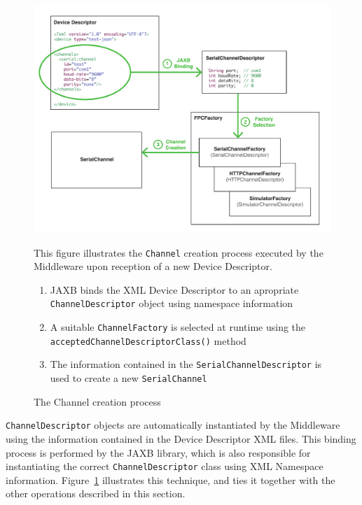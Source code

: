 \begin{figure}[!hbt]
\includegraphics[width=\textwidth]{imgs/channel_creation_process.pdf}
\caption{The Channel creation process}
\label{fig:channel.creation}
{
\begin{figurenote}
This figure illustrates the \texttt{Channel} creation process executed by the Middleware upon reception of a new Device Descriptor.
\begin{enumerate}
  \itemsep0em
  \item JAXB binds the XML Device Descriptor to an apropriate \texttt{ChannelDescriptor} object using namespace information
  \item A suitable \texttt{ChannelFactory} is selected at runtime using the \texttt{acceptedChannelDescriptorClass()} method
  \item The information contained in the \texttt{SerialChannelDescriptor} is used to create a new \texttt{SerialChannel}
\end{enumerate}
\end{figurenote}
}
\end{figure}

\texttt{ChannelDescriptor} objects are automatically instantiated by the Middleware using the information contained in the Device Descriptor XML files. This binding process is performed by the JAXB library, which is also responsible for instantiating the correct \texttt{ChannelDescriptor} class using XML Namespace information. Figure~\ref{fig:channel.creation} illustrates this technique, and ties it together with the other operations described in this section.

